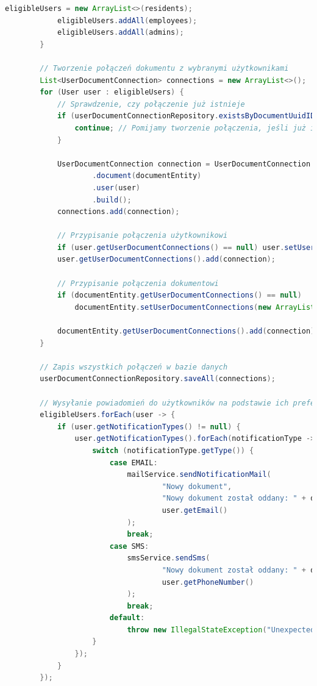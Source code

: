 \begin{lstlisting}[language=Java, caption=Metoda dodawania dokumentu w klasie \texttt{DocumentServiceImp}]
            eligibleUsers = new ArrayList<>(residents);
            eligibleUsers.addAll(employees);
            eligibleUsers.addAll(admins);
        }

        // Tworzenie połączeń dokumentu z wybranymi użytkownikami
        List<UserDocumentConnection> connections = new ArrayList<>();
        for (User user : eligibleUsers) {
            // Sprawdzenie, czy połączenie już istnieje
            if (userDocumentConnectionRepository.existsByDocumentUuidIDAndUserUuidID(documentEntity.getUuidID(), user.getUuidID())) {
                continue; // Pomijamy tworzenie połączenia, jeśli już istnieje
            }

            UserDocumentConnection connection = UserDocumentConnection.builder()
                    .document(documentEntity)
                    .user(user)
                    .build();
            connections.add(connection);

            // Przypisanie połączenia użytkownikowi
            if (user.getUserDocumentConnections() == null) user.setUserDocumentConnections(new ArrayList<>());
            user.getUserDocumentConnections().add(connection);

            // Przypisanie połączenia dokumentowi
            if (documentEntity.getUserDocumentConnections() == null)
                documentEntity.setUserDocumentConnections(new ArrayList<>());

            documentEntity.getUserDocumentConnections().add(connection);
        }

        // Zapis wszystkich połączeń w bazie danych
        userDocumentConnectionRepository.saveAll(connections);

        // Wysyłanie powiadomień do użytkowników na podstawie ich preferencji
        eligibleUsers.forEach(user -> {
            if (user.getNotificationTypes() != null) {
                user.getNotificationTypes().forEach(notificationType -> {
                    switch (notificationType.getType()) {
                        case EMAIL:
                            mailService.sendNotificationMail(
                                    "Nowy dokument",
                                    "Nowy dokument został oddany: " + documentEntity.getDocumentName(),
                                    user.getEmail()
                            );
                            break;
                        case SMS:
                            smsService.sendSms(
                                    "Nowy dokument został oddany: " + documentEntity.getDocumentName(),
                                    user.getPhoneNumber()
                            );
                            break;
                        default:
                            throw new IllegalStateException("Unexpected value: " + notificationType.getType());
                    }
                });
            }
        });


\end{lstlisting}
